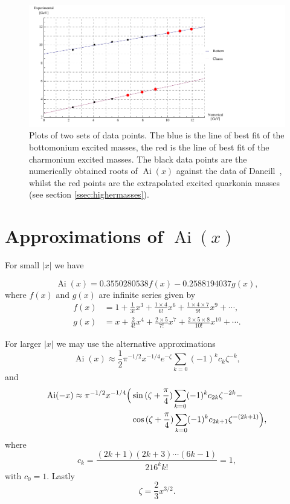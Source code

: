 \documentclass[]{article}
\renewcommand{\mod}[1]{\ensuremath{\lvert {#1} \rvert}}
\newcommand{\Ai}[1]{\ensuremath{\operatorname{Ai}({#1})}}
\begin{document}
\begin{figure}[H]
	\hspace*{-0.15\textwidth}
	\centering
	\includegraphics[scale=1.3]{experimental-numerical}
	\caption{Plots of two sets of data points. The blue is the line of best fit of the bottomonium excited masses, the red is the line of best fit of the charmonium excited masses. The black data points are the numerically obtained roots of \Ai{x} against the data of Daneill~\cite{ref:gdaniell}, whilst the red points are the extrapolated excited quarkonia masses (see section \ref{ssec:highermasses}).}
	\label{fig:data}
\end{figure}


\appendix
\section{Approximations of \Ai{x}}\label{app:approximations}

For small $\mod{x}$ we have

\[\Ai{x} = 0.3550280538f(x) - 0.2588194037g(x),\]
where $f(x)$ and $g(x)$ are infinite series given by
\begin{align}
f(x) &= 1 + \frac{1}{3!}x^{3} + \frac{1\times4}{6!}x^{6} + \frac{1\times4\times{7}}{9!}x^{9} + \dotsb,\label{eqn:airyfirstf}\\
g(x) &= x + \frac{2}{4!}x^{4} + \frac{2\times5}{7!}x^{7} + \frac{2\times5\times{8}}{10!}x^{10} + \dotsb\label{eqn:airyfirstg}.
\end{align}

For larger $\mod{x}$ we may use the alternative approximations
\[
\Ai{x} \approx \frac{1}{2}\pi^{-1/2}x^{-1/4}e^{-\zeta} \sum\limits_{k=0} (-1)^{k}c_{k}\zeta^{-k},
\]
and
\[
	\begin{split}
		\Ai{-x} \approx \pi^{-1/2}x^{-1/4}
		\Bigl(
			&\sin{(\zeta + \frac{\pi}{4})}\sum\limits_{k=0}(-1)^{k}c_{2k}\zeta^{-2k} -\\
			&\cos{(\zeta + \frac{\pi}{4})}\sum\limits_{k=0}(-1)^{k}c_{2k+1}\zeta^{-(2k+1)}
		\Bigr),
	\end{split}
\]
where
\begin{equation}\label{eqn:ck}
c_{k} = \frac{(2k+1)(2k+3)\dotsb(6k-1)}{216^{k}k!} = 1,
\end{equation}
with $c_{0} = 1$. Lastly
\[
\zeta = \frac{2}{3}x^{3/2}.
\]
\end{document}
